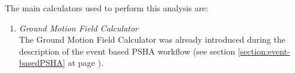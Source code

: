 The main calculators used to perform this analysis are:
\begin{enumerate}
\item \emph{Ground Motion Field Calculator} \hfill \\
The Ground Motion Field Calculator was already 
introduced during the description of the event based PSHA workflow (see 
section \ref{section:event-basedPSHA} at page \pageref{section:classicalPSHA}).
\end{enumerate}
\cleardoublepage
